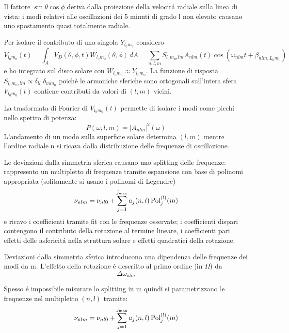 \documentclass[../main.tex]{subfiles}
\begin{document}
Il fattore $\sin{\theta}\cos{\phi}$ deriva dalla proiezione della velocit\'a radiale sulla linea di vista: i modi relativi alle oscillazioni dei 5 minuti di grado l non elevato causano uno spostamento quasi totalmente radiale.

Per isolare il contributo di una singola $Y_{l_0m_0}$ considero
\begin{equation}
V_{l_0m_0}(t)=\int_AV_D(\theta,\phi,t)W_{l_0m_0}(\theta,\phi)\,dA=\sum_{n,l,m}S_{l_0m_0,lm}A_{nlm}(t)\cos{(\omega_{nlm}t+\beta_{nlm,L_0m_0})}
\end{equation}
e ho integrato sul disco solare con $W_{l_0m_0}\approx Y_{l_0m_0}$. La funzione di risposta $S_{l_0m_0,lm}\propto\delta_{ll_0}\delta_{mm_0}$ poich\'e le armoniche sferiche sono ortogonali sull'intera sfera $V_{l_0m_0}(t)$ contiene contributi da valori di $(l,m)$ vicini.

La trasformata di Fourier di $V_{l_0m_0}(t)$ permette di isolare i modi come picchi nello spettro di potenza:
\begin{equation}
P(\omega,l,m)=|A_{nlm}|^2(\omega)
\end{equation}
L'andamento di un modo sulla superficie solare determina $(l,m)$ mentre l'ordine radiale n si ricava dalla distribuzione delle frequenze di oscillazione.

\begin{errata}
Le deviazioni dalla simmetria sferica causano uno splitting delle frequenze: rappresento un multipletto di frequenze tramite espansione con base di polinomi appropriata (solitamente si usano i polinomi di Legendre)
\begin{equation}
\nu_{nlm}=\nu_{nl0}+\sum_{j=1}^{j_{\max}}a_j(n,l)\operatorname{Pol}_j^{(l)}(m)\label{eq:freqmulti}
\end{equation}
e ricavo i coefficienti tramite fit con le frequenze osservate; i coefficienti dispari contengono il contributo della rotazione al termine lineare, i coefficienti pari effetti delle asfericit\'a nella struttura solare e effetti quadratici della rotazione.
\end{errata}


\begin{workout}

Deviazioni dalla simmetria sferica introducono una dipendenza delle frequenze dei modi da m. L'effetto della rotazione \'e descritto al primo ordine (in $\Omega$) da 
\begin{equation}
\Delta\omega_{nlm}
\end{equation}

Spesso \'e impossibile misurare lo splitting in m quindi si parametrizzano le frequenze nel multipletto $(n,l)$ tramite:
\begin{equation}
\nu_{nlm}=\nu_{nl0}+\sum_{j=1}^{j_{\max}}a_j(n,l)\operatorname{Pol}_j^{(l)}(m)\label{eq:freqmulti}
\end{equation}


\end{workout}
\end{document}
